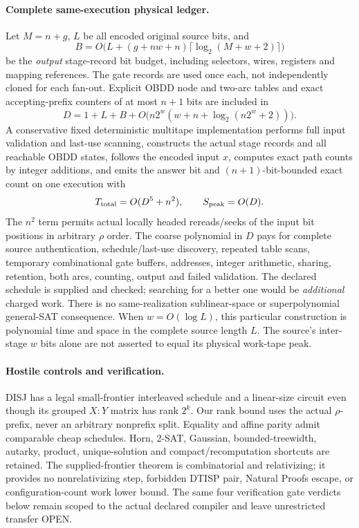 \documentclass[11pt]{article}
\begin{document}
\paragraph{Complete same-execution physical ledger.}
Let $M=n+g$, $L$ be all encoded original source bits, and
\[
B=O\bigl(L+(g+nw+n)\lceil\log_2(M+w+2)\rceil\bigr)
\]
be the \emph{output} stage-record bit budget, including selectors, wires, registers and mapping references. The gate records are used once each, not independently cloned for each fan-out. Explicit OBDD node and two-arc tables and exact accepting-prefix counters of at most $n+1$ bits are included in
\[
D=1+L+B+O\bigl(n2^w(w+n+\log_2(n2^w+2))\bigr).
\]
A conservative fixed deterministic multitape implementation performs full input validation and last-use scanning, constructs the actual stage records and all reachable OBDD states, follows the encoded input $x$, computes exact path counts by integer additions, and emits the answer bit and $(n+1)$-bit-bounded exact count on one execution with
\[
T_{\rm total}=O(D^5+n^2),\qquad S_{\rm peak}=O(D).
\]
The $n^2$ term permits actual locally headed rereads/seeks of the input bit positions in arbitrary $\rho$ order. The coarse polynomial in $D$ pays for complete source authentication, schedule/last-use discovery, repeated table scans, temporary combinational gate buffers, addresses, integer arithmetic, sharing, retention, both arcs, counting, output and failed validation. The declared schedule is supplied and checked; searching for a better one would be \emph{additional} charged work. There is no same-realization sublinear-space or superpolynomial general-SAT consequence. When $w=O(\log L)$, this particular construction is polynomial time and space in the complete source length $L$. The source's inter-stage $w$ bits alone are not asserted to equal its physical work-tape peak.

\paragraph{Hostile controls and verification.}
DISJ has a legal small-frontier interleaved schedule and a linear-size circuit even though its grouped $X:Y$ matrix has rank $2^k$. Our rank bound uses the actual $\rho$-prefix, never an arbitrary nonprefix split. Equality and affine parity admit comparable cheap schedules. Horn, 2-SAT, Gaussian, bounded-treewidth, autarky, product, unique-solution and compact/recomputation shortcuts are retained. The supplied-frontier theorem is combinatorial and relativizing; it provides no nonrelativizing step, forbidden DTISP pair, Natural Proofs escape, or configuration-count work lower bound. The same four verification gate verdicts below remain scoped to the actual declared compiler and leave unrestricted transfer OPEN.
\end{document}
